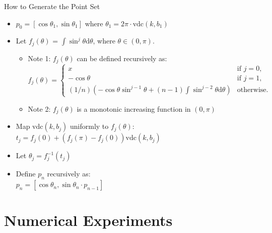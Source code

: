 \begin{frame}{How to Generate the Point Set}
\protect\hypertarget{how-to-generate-the-point-set}{}

\begin{itemize}
\item
  \(p_0 = [\cos\theta_1, \sin\theta_1]\) where
  \(\theta_1 = 2\pi\cdot\mathrm{vdc}(k,b_1)\)
\item
  Let \(f_j(\theta)\) = \(\int\sin^j\theta \mathrm{d}\theta\), where
  \(\theta\in (0,\pi)\).\\

  \begin{itemize}
  \item
    Note 1: \(f_j(\theta)\) can be defined recursively as:
    \[f_j(\theta) =
    \begin{cases}
    x               & \text{if } j = 0 , \\
    -\cos\theta     & \text{if } j = 1 , \\
    (1/n)( -\cos\theta \sin^{j-1}\theta + (n-1)\int\sin^{j-2}\theta \mathrm{d}\theta) & \text{otherwise}.
    \end{cases}\]
  \item
    Note 2: \(f_j(\theta)\) is a monotonic increasing function in
    \((0,\pi)\)
  \end{itemize}
\item
  Map \(\mathrm{vdc}(k,b_j)\) uniformly to \(f_j(\theta)\):\\
  \(t_j = f_j(0) + (f_j(\pi) - f_j(0)) \mathrm{vdc}(k,b_j)\)
\item
  Let \(\theta_j = f_j^{-1}(t_j)\)
\item
  Define \(p_n\) recursively as:\\
  \(p_n = [\cos\theta_n, \sin\theta_n \cdot p_{n-1}]\)
\end{itemize}

\end{frame}

\hypertarget{numerical-experiments}{%
\section{Numerical Experiments}\label{numerical-experiments}}

